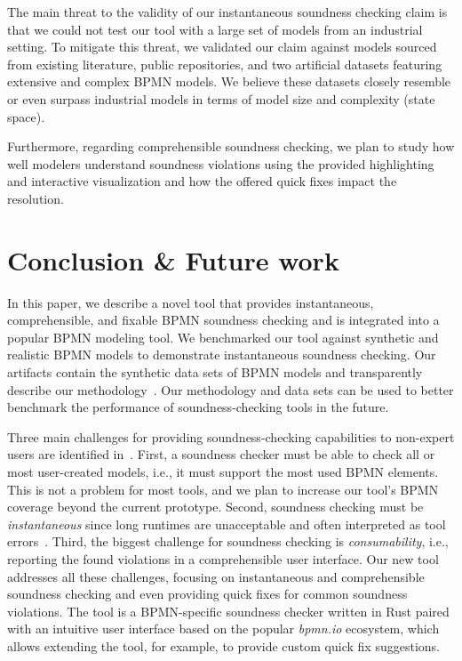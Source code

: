 \documentclass[runningheads]{llncs}
\begin{document}
The main threat to the validity of our instantaneous soundness checking claim is that we could not test our tool with a large set of models from an industrial setting.
To mitigate this threat, we validated our claim against models sourced from existing literature, public repositories, and two artificial datasets featuring extensive and complex BPMN models.
We believe these datasets closely resemble or even surpass industrial models in terms of model size and complexity (state space).

Furthermore, regarding comprehensible soundness checking, we plan to study how well modelers understand soundness violations using the provided highlighting and interactive visualization and how the offered quick fixes impact the resolution.

\section{Conclusion \& Future work} \label{sec:conclusion}
In this paper, we describe a novel tool that provides instantaneous, comprehensible, and fixable BPMN soundness checking and is integrated into a popular BPMN modeling tool.
We benchmarked our tool against synthetic and realistic BPMN models to demonstrate instantaneous soundness checking.
Our artifacts contain the synthetic data sets of BPMN models and transparently describe our methodology~\cite{noauthorgivenBPM2024Artifacts2024}.
Our methodology and data sets can be used to better benchmark the performance of soundness-checking tools in the future.

Three main challenges for providing soundness-checking capabilities to non-expert users are identified in~\cite{fahlandAnalysisDemandInstantaneous2011}.
First, a soundness checker must be able to check all or most user-created models, i.e., it must support the most used BPMN elements.
This is not a problem for most tools, and we plan to increase our tool's BPMN coverage beyond the current prototype.
Second, soundness checking must be \textit{instantaneous} since long runtimes are unacceptable and often interpreted as tool errors~\cite{fahlandAnalysisDemandInstantaneous2011}.
Third, the biggest challenge for soundness checking is \textit{consumability}, i.e., reporting the found violations in a comprehensible user interface.
Our new tool addresses all these challenges, focusing on instantaneous and comprehensible soundness checking and even providing quick fixes for common soundness violations.
The tool is a BPMN-specific soundness checker written in Rust paired with an intuitive user interface based on the popular \textit{bpmn.io} ecosystem, which allows extending the tool, for example, to provide custom quick fix suggestions.
\end{document}
